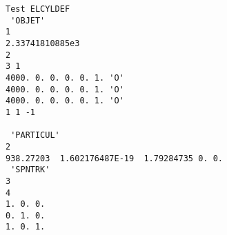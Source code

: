 \documentclass[10pt]{article}
\begin{document}
\clearpage

{\small
\begin{verbatim}
Test ELCYLDEF                                                                                                 
 'OBJET'                                                                                                      1
2.33741810885e3                                                                                               
2                                                                                                             
3 1                                                                                                           
4000. 0. 0. 0. 0. 1. 'O'                                                                                      
4000. 0. 0. 0. 0. 1. 'O'                                                                                      
4000. 0. 0. 0. 0. 1. 'O'                                                                                      
1 1 -1                                                                                                         
                                                                                                              
 'PARTICUL'                                                                                                   2
938.27203  1.602176487E-19  1.79284735 0. 0.                                                                  
 'SPNTRK'                                                                                                     3
4                                                                                                             
1. 0. 0.                                                                                                      
0. 1. 0.                                                                                                      
1. 0. 1.                                                                                                      
                                                                                                              

\end{verbatim}}
\end{document}
